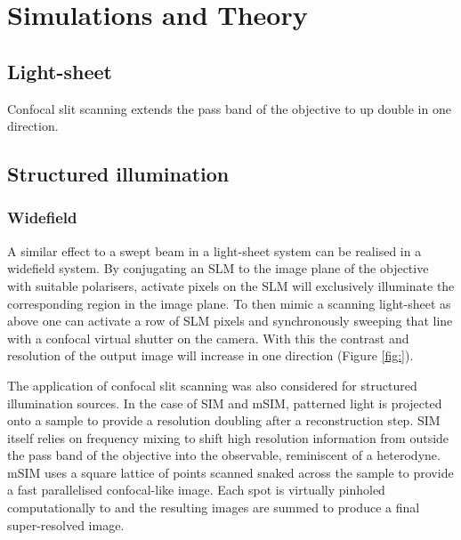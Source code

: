%  
%  

\section{Simulations and Theory}
\subsection{Light-sheet}

Confocal slit scanning extends the pass band of the objective to up double in one direction.

\subsection{Structured illumination}

\subsubsection{Widefield}

A similar effect to a swept beam in a light-sheet system can be realised in a widefield system.
By conjugating an SLM to the image plane of the objective with suitable polarisers, activate pixels on the SLM will exclusively illuminate the corresponding region in the image plane.
To then mimic a scanning light-sheet as above one can activate a row of SLM pixels and synchronously sweeping that line with a confocal virtual shutter on the camera.
With this the contrast and resolution of the output image will increase in one direction (Figure \ref{fig:}).

The application of confocal slit scanning was also considered for structured illumination sources.
In the case of SIM and mSIM, patterned light is projected onto a sample to provide a resolution doubling after a reconstruction step.
SIM itself relies on frequency mixing to shift high resolution information from outside the pass band of the objective into the observable, reminiscent of a heterodyne.
mSIM uses a square lattice of points scanned snaked across the sample to provide a fast parallelised confocal-like image.
Each spot is virtually pinholed computationally to and the resulting images are summed to produce a final super-resolved image.

